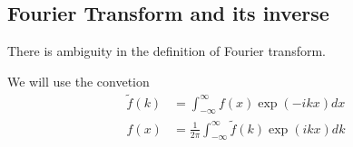 \documentclass[a4paper]{article}
\newcommand*{\ft}{\tilde}
\begin{document}
\subsection{Fourier Transform and its inverse}

There is ambiguity in the definition of Fourier transform.

\begin{convention}
  We will use the convetion
  \begin{align*}
    \ft f(k) &= \int_{-\infty}^{\infty} f(x) \exp(-ikx) dx \\
    f(x) &= \frac{1}{2\pi} \int_{-\infty}^{\infty} \ft f(k) \exp(ikx) dk
  \end{align*}
\end{convention}
\end{document}
